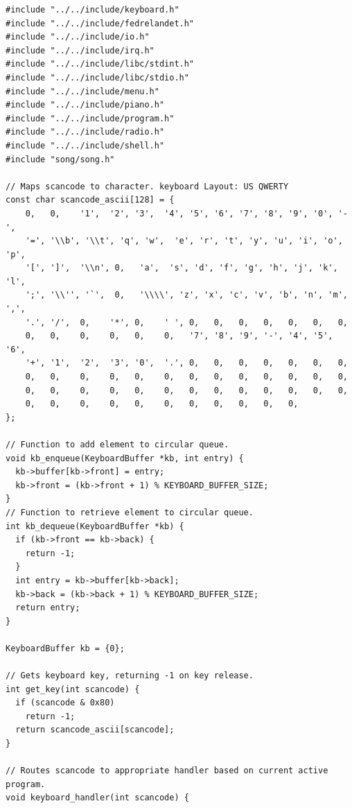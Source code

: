 \documentclass[../main.tex]{subfiles}
\begin{document}
\label{lst:keyboard_c}
\begin{verbatim}
#include "../../include/keyboard.h"
#include "../../include/fedrelandet.h"
#include "../../include/io.h"
#include "../../include/irq.h"
#include "../../include/libc/stdint.h"
#include "../../include/libc/stdio.h"
#include "../../include/menu.h"
#include "../../include/piano.h"
#include "../../include/program.h"
#include "../../include/radio.h"
#include "../../include/shell.h"
#include "song/song.h"

// Maps scancode to character. keyboard Layout: US QWERTY
const char scancode_ascii[128] = {
    0,   0,    '1',  '2', '3',  '4', '5', '6', '7', '8', '9', '0', '-',
    '=', '\\b', '\\t', 'q', 'w',  'e', 'r', 't', 'y', 'u', 'i', 'o', 'p',
    '[', ']',  '\\n', 0,   'a',  's', 'd', 'f', 'g', 'h', 'j', 'k', 'l',
    ';', '\\'', '`',  0,   '\\\\', 'z', 'x', 'c', 'v', 'b', 'n', 'm', ',',
    '.', '/',  0,    '*', 0,    ' ', 0,   0,   0,   0,   0,   0,   0,
    0,   0,    0,    0,   0,    0,   '7', '8', '9', '-', '4', '5', '6',
    '+', '1',  '2',  '3', '0',  '.', 0,   0,   0,   0,   0,   0,   0,
    0,   0,    0,    0,   0,    0,   0,   0,   0,   0,   0,   0,   0,
    0,   0,    0,    0,   0,    0,   0,   0,   0,   0,   0,   0,   0,
    0,   0,    0,    0,   0,    0,   0,   0,   0,   0,   0,
};

// Function to add element to circular queue.
void kb_enqueue(KeyboardBuffer *kb, int entry) {
  kb->buffer[kb->front] = entry;
  kb->front = (kb->front + 1) % KEYBOARD_BUFFER_SIZE;
}
// Function to retrieve element to circular queue.
int kb_dequeue(KeyboardBuffer *kb) {
  if (kb->front == kb->back) {
    return -1;
  }
  int entry = kb->buffer[kb->back];
  kb->back = (kb->back + 1) % KEYBOARD_BUFFER_SIZE;
  return entry;
}

KeyboardBuffer kb = {0};

// Gets keyboard key, returning -1 on key release.
int get_key(int scancode) {
  if (scancode & 0x80)
    return -1;
  return scancode_ascii[scancode];
}

// Routes scancode to appropriate handler based on current active program.
void keyboard_handler(int scancode) {


\end{verbatim}
\end{document}
